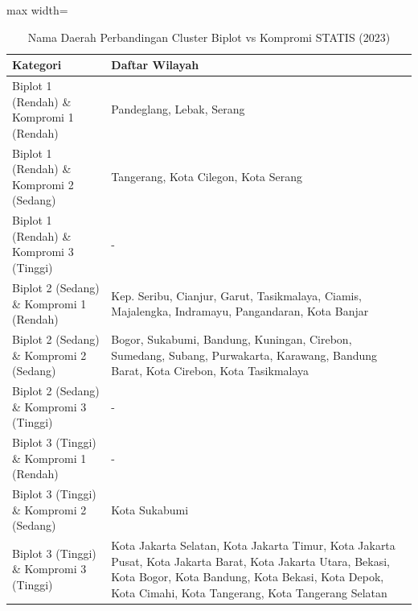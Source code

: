 \begin{table}[H]
\centering
\caption{Nama Daerah Perbandingan Cluster Biplot vs Kompromi STATIS (2023)} \label{tab:app2biplot_comp_name_2023}
\begin{adjustbox}{max width=\textwidth}
\begin{tabular}{|p{4cm}|p{10cm}|}
\hline
\textbf{Kategori} & \textbf{Daftar Wilayah} \\
\hline
Biplot 1 (Rendah) \& Kompromi 1 (Rendah) & Pandeglang, Lebak, Serang \\
\hline
Biplot 1 (Rendah) \& Kompromi 2 (Sedang) & Tangerang, Kota Cilegon, Kota Serang \\
\hline
Biplot 1 (Rendah) \& Kompromi 3 (Tinggi) & - \\
\hline
Biplot 2 (Sedang) \& Kompromi 1 (Rendah) & Kep. Seribu, Cianjur, Garut, Tasikmalaya, Ciamis, Majalengka, Indramayu, Pangandaran, Kota Banjar \\
\hline
Biplot 2 (Sedang) \& Kompromi 2 (Sedang) & Bogor, Sukabumi, Bandung, Kuningan, Cirebon, Sumedang, Subang, Purwakarta, Karawang, Bandung Barat, Kota Cirebon, Kota Tasikmalaya \\
\hline
Biplot 2 (Sedang) \& Kompromi 3 (Tinggi) & - \\
\hline
Biplot 3 (Tinggi) \& Kompromi 1 (Rendah) & - \\
\hline
Biplot 3 (Tinggi) \& Kompromi 2 (Sedang) & Kota Sukabumi \\
\hline
Biplot 3 (Tinggi) \& Kompromi 3 (Tinggi) & Kota Jakarta Selatan, Kota Jakarta Timur, Kota Jakarta Pusat, Kota Jakarta Barat, Kota Jakarta Utara, Bekasi, Kota Bogor, Kota Bandung, Kota Bekasi, Kota Depok, Kota Cimahi, Kota Tangerang, Kota Tangerang Selatan \\
\hline
\end{tabular}
\end{adjustbox}
\end{table}